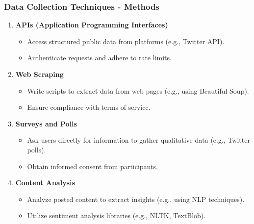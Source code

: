 \documentclass{beamer}
\begin{document}
\begin{frame}[fragile]
    \frametitle{Data Collection Techniques - Methods}
    \begin{enumerate}
        \item \textbf{APIs (Application Programming Interfaces)}
            \begin{itemize}
                \item Access structured public data from platforms (e.g., Twitter API).
                \item Authenticate requests and adhere to rate limits.
            \end{itemize}
        \item \textbf{Web Scraping}
            \begin{itemize}
                \item Write scripts to extract data from web pages (e.g., using Beautiful Soup).
                \item Ensure compliance with terms of service.
            \end{itemize}
        \item \textbf{Surveys and Polls}
            \begin{itemize}
                \item Ask users directly for information to gather qualitative data (e.g., Twitter polls).
                \item Obtain informed consent from participants.
            \end{itemize}
        \item \textbf{Content Analysis}
            \begin{itemize}
                \item Analyze posted content to extract insights (e.g., using NLP techniques).
                \item Utilize sentiment analysis libraries (e.g., NLTK, TextBlob).
            \end{itemize}
    \end{enumerate}
\end{frame}
\end{document}
